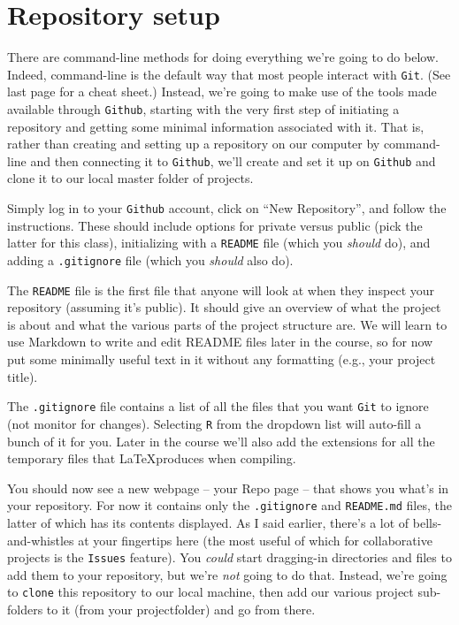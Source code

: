 \documentclass[12pt,letterpaper]{article}
\begin{document}
\section{Repository setup}
There are command-line methods for doing everything we're going to do below.  Indeed, command-line is the default way that most people interact with \texttt{Git}. (See last page for a cheat sheet.)  Instead, we're going to make use of the tools made available through \texttt{Github}, starting with the very first step of initiating a repository and getting some minimal information associated with it.  That is, rather than creating and setting up a repository on our computer by command-line and then connecting it to \texttt{Github}, we'll create and set it up on \texttt{Github} and clone it to our local  master folder of projects.

Simply log in to your \texttt{Github} account, click on ``New Repository'', and follow the instructions.  These should include options for private versus public (pick the latter for this class), initializing with a \texttt{README} file (which you \emph{should} do), and adding a \texttt{.gitignore} file (which you \emph{should} also do).

The \texttt{README} file is the first file that anyone will look at when they inspect your repository (assuming it's public).  It should give an overview of what the project is about and what the various parts of the project structure are.  We will learn to use Markdown to write and edit README files later in the course, so for now put some minimally useful text in it without any formatting (e.g., your project title).

The \texttt{.gitignore} file contains a list of all the files that you want \texttt{Git} to ignore (not monitor for changes).  Selecting \texttt{R} from the dropdown list will auto-fill a bunch of it for you.  Later in the course we'll also add the extensions for all the temporary files that \LaTeX produces when compiling.

You should now see a new webpage -- your Repo page -- that shows you what's in your repository.  For now it contains only the  \texttt{.gitignore} and \texttt{README.md} files, the latter of which has its contents displayed.  As I said earlier, there's a lot of bells-and-whistles at your fingertips here (the most useful of which for collaborative projects is the \texttt{Issues} feature).  You \emph{could} start dragging-in directories and files to add them to your repository, but we're \emph{not} going to do that.  Instead, we're going to \texttt{clone} this repository to our local machine, then add our various project sub-folders to it (from your projectfolder) and go from there.
\end{document}
